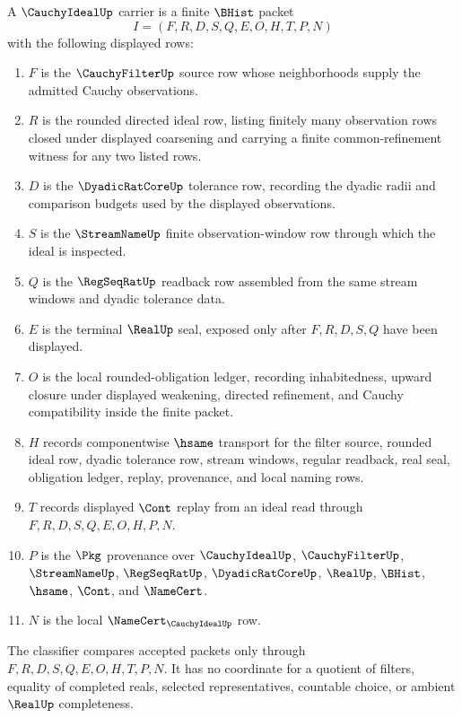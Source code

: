 \begin{definition}
\label{def:cauchy-ideal-carrier}
A $\CauchyIdealUp$ carrier is a finite $\BHist$ packet
$$
I=(F,R,D,S,Q,E,O,H,T,P,N)
$$
with the following displayed rows:
\begin{enumerate}
\item $F$ is the $\CauchyFilterUp$ source row whose neighborhoods supply the admitted Cauchy observations.
\item $R$ is the rounded directed ideal row, listing finitely many observation rows closed under displayed coarsening and carrying a finite common-refinement witness for any two listed rows.
\item $D$ is the $\DyadicRatCoreUp$ tolerance row, recording the dyadic radii and comparison budgets used by the displayed observations.
\item $S$ is the $\StreamNameUp$ finite observation-window row through which the ideal is inspected.
\item $Q$ is the $\RegSeqRatUp$ readback row assembled from the same stream windows and dyadic tolerance data.
\item $E$ is the terminal $\RealUp$ seal, exposed only after $F,R,D,S,Q$ have been displayed.
\item $O$ is the local rounded-obligation ledger, recording inhabitedness, upward closure under displayed weakening, directed refinement, and Cauchy compatibility inside the finite packet.
\item $H$ records componentwise $\hsame$ transport for the filter source, rounded ideal row, dyadic tolerance row, stream windows, regular readback, real seal, obligation ledger, replay, provenance, and local naming rows.
\item $T$ records displayed $\Cont$ replay from an ideal read through $F,R,D,S,Q,E,O,H,P,N$.
\item $P$ is the $\Pkg$ provenance over $\CauchyIdealUp$, $\CauchyFilterUp$, $\StreamNameUp$, $\RegSeqRatUp$, $\DyadicRatCoreUp$, $\RealUp$, $\BHist$, $\hsame$, $\Cont$, and $\NameCert$.
\item $N$ is the local $\NameCert_{\CauchyIdealUp}$ row.
\end{enumerate}
The classifier compares accepted packets only through $F,R,D,S,Q,E,O,H,T,P,N$. It has no coordinate for a quotient of filters, equality of completed reals, selected representatives, countable choice, or ambient $\RealUp$ completeness.
\end{definition}

